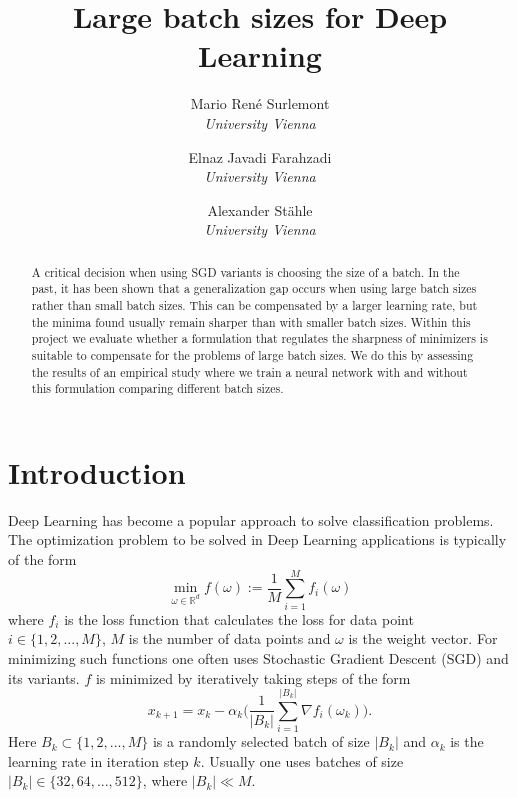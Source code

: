 \documentclass[10pt,conference,compsocconf]{IEEEtran}
\begin{document}
\title{Large batch sizes for Deep Learning}
\author{
  Mario René Surlemont\\
  \textit{University Vienna}\and Elnaz Javadi Farahzadi\\
  \textit{University Vienna}\and Alexander Stähle\\
  \textit{University Vienna}
}

\maketitle

\begin{abstract}
A critical decision when using SGD variants is choosing the size of a batch. In the past, it has been shown that a generalization gap occurs when using large batch sizes rather than small batch sizes. This can be compensated  by a larger learning rate, but the minima found usually remain sharper than with smaller batch sizes. Within this project we evaluate whether a formulation that regulates the sharpness of minimizers is suitable to compensate for the problems of large batch sizes. We do this by assessing the results of an empirical study where we train a neural network with and without this formulation comparing different batch sizes. 
\end{abstract}

\section{Introduction}
\label{sec:introduction}
Deep Learning has become a popular approach to solve  classification problems. 
The optimization problem to be solved in Deep Learning applications is typically of the form 
\begin{equation} \label{eq:loss}
\min_{\omega \in \mathbb{R}^d}{f(\omega) := \frac{1}{M} \sum_{i = 1}^M{f_i(\omega)}}
\end{equation}
where $f_i$ is the loss function that calculates the loss for data point $i \in \{1, 2, ..., M\}$, $M$ is the number of data points and $\omega$ is the weight vector. 
For minimizing such functions one often uses Stochastic Gradient Descent (SGD) and its variants. $f$ is minimized by iteratively taking steps of the form
\begin{equation}
x_{k+1} = x_k - \alpha_k \biggl(\frac{1}{|B_k|} \sum_{i = 1}^{|B_k|}{\nabla f_i(\omega_k) \biggl)}.
\end{equation}
Here $B_k \subset \{1,2,..., M\}$ is a randomly selected batch of size $|B_k|$ and $\alpha_k$ is the learning rate in iteration step $k$. Usually one uses batches of size $|B_k| \in \{32, 64, ..., 512\}$, where $|B_k| \ll M$. 
\end{document}
